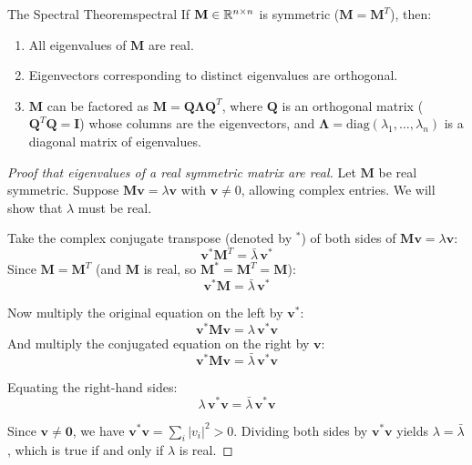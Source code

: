 \begin{theorem}{The Spectral Theorem}{spectral}
If $\mathbf{M} \in \mathbb{R}^{n \times n}$ is symmetric ($\mathbf{M} = \mathbf{M}^T$), then:
\begin{enumerate}[label=(\roman*)]
    \item All eigenvalues of $\mathbf{M}$ are real.
    \item Eigenvectors corresponding to distinct eigenvalues are orthogonal.
    \item $\mathbf{M}$ can be factored as $\mathbf{M} = \mathbf{Q} \boldsymbol{\Lambda} \mathbf{Q}^T$, where $\mathbf{Q}$ is an orthogonal matrix ($\mathbf{Q}^T\mathbf{Q} = \mathbf{I}$) whose columns are the eigenvectors, and $\boldsymbol{\Lambda} = \text{diag}(\lambda_1, \ldots, \lambda_n)$ is a diagonal matrix of eigenvalues.
\end{enumerate}
\end{theorem}

\begin{proof}[Proof that eigenvalues of a real symmetric matrix are real]
Let $\mathbf M$ be real symmetric. Suppose $\mathbf M\mathbf v=\lambda\mathbf v$ with $\mathbf v\ne0$, allowing complex entries. We will show that $\lambda$ must be real.

Take the complex conjugate transpose (denoted by $^*$) of both sides of $\mathbf{M}\mathbf{v} = \lambda \mathbf{v}$:
\begin{equation}
    \mathbf{v}^* \mathbf{M}^T = \bar{\lambda} \, \mathbf{v}^*
\end{equation}
Since $\mathbf{M} = \mathbf{M}^T$ (and $\mathbf{M}$ is real, so $\mathbf{M}^* = \mathbf{M}^T = \mathbf{M}$):
\begin{equation}
    \mathbf{v}^* \mathbf{M} = \bar{\lambda} \, \mathbf{v}^*
\end{equation}

Now multiply the original equation on the left by $\mathbf{v}^*$:
\begin{equation}
    \mathbf{v}^* \mathbf{M} \mathbf{v} = \lambda \, \mathbf{v}^* \mathbf{v}
\end{equation}
And multiply the conjugated equation on the right by $\mathbf{v}$:
\begin{equation}
    \mathbf{v}^* \mathbf{M} \mathbf{v} = \bar{\lambda} \, \mathbf{v}^* \mathbf{v}
\end{equation}

Equating the right-hand sides:
\begin{equation}
    \lambda \, \mathbf{v}^* \mathbf{v} = \bar{\lambda} \, \mathbf{v}^* \mathbf{v}
\end{equation}

Since $\mathbf{v} \neq \mathbf{0}$, we have $\mathbf{v}^* \mathbf{v} = \sum_i |v_i|^2 > 0$. Dividing both sides by $\mathbf{v}^*\mathbf{v}$ yields $\lambda = \bar{\lambda}$, which is true if and only if $\lambda$ is real.
\end{proof}


